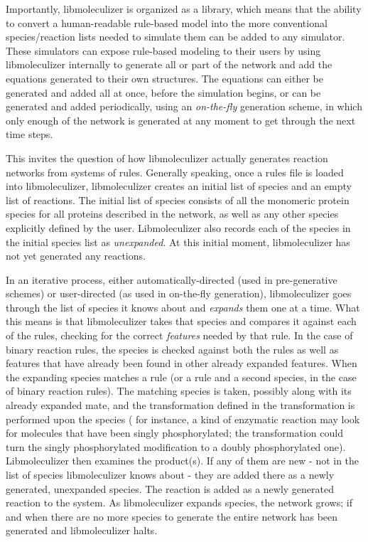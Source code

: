 Importantly, libmoleculizer is organized as a library, which means
that the ability to convert a human-readable rule-based model into the
more conventional species/reaction lists needed to simulate them can
be added to any simulator.  These simulators can expose rule-based
modeling to their users by using libmoleculizer internally to generate
all or part of the network and add the equations generated to their own
structures.  The equations can either be generated and added all at
once, before the simulation begins, or can be generated and added
periodically, using an {\it on-the-fly} generation scheme, in which
only enough of the network is generated at any moment to get through
the next time steps.

This invites the question of how libmoleculizer actually
generates reaction networks from systems of rules. Generally speaking,
once a rules file is loaded into libmoleculizer, libmoleculizer
creates an initial list of species and an empty list of reactions.
The initial list of species consists of all the monomeric protein
species for all proteins described in the network, as well as any
other species explicitly defined by the user.  Libmoleculizer also
records each of the species in the initial species list as {\it
  unexpanded}.  At this initial moment, libmoleculizer has not yet
generated any reactions.

In an iterative process, either automatically-directed (used in
pre-generative schemes) or user-directed (as used in on-the-fly
generation), libmoleculizer goes through the list of species it knows
about and {\it expands} them one at a time.  What this means is that
libmoleculizer takes that species and compares it against each of the
rules, checking for the correct {\it features} needed by that
rule.  In the case of binary reaction rules, the species is checked
against both the rules as well as features that have already been
found in other already expanded features.  When the expanding
species matches a rule (or a rule and a second species, in the case of
binary reaction rules).  The matching species is taken, possibly along
with its already expanded mate, and the transformation defined in the
transformation is performed upon the species ( for instance, a kind of
enzymatic reaction may look for molecules that have been singly
phosphorylated; the transformation could turn the singly
phosphorylated modification to a doubly phosphorylated
one). Libmoleculizer then examines the product(s).  If any of them are
new - not in the list of species libmoleculizer knows about - they
are added there as a newly generated, unexpanded species.  The
reaction is added as a newly generated reaction to the system.  As
libmoleculizer expands species, the network grows; if and when there
are no more species to generate the entire network has been generated
and libmoleculizer halts.  



